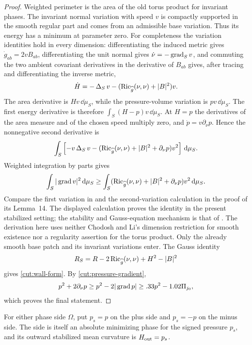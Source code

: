 \begin{proof}
Weighted perimeter is the area of the old torus product for invariant
phases.  The invariant normal variation with speed $v$ is compactly
supported in the smooth regular part and comes from an admissible base
variation.  Thus its energy has a minimum at parameter zero.
For completeness the variation identities hold in every dimension:
differentiating the induced metric gives $\dot g_{ab}=2vB_{ab}$,
differentiating the unit normal gives $\dot\nu=-\operatorname{grad}_Sv$, and
commuting the two ambient covariant derivatives in the derivative of
$B_{ab}$ gives, after tracing and differentiating the inverse metric,
\[
 \dot H=-\operatorname{\Delta}_S v-(\operatorname{Ric}_{\widehat g}(\nu,\nu)+|B|^2)v.
\]
The area derivative is $Hv\,\dd\mu_S$, while the pressure-volume
variation is $pv\,\dd\mu_S$.  The first energy derivative is therefore
$\int_S(H-p)v\,\dd\mu_S$.  At $H=p$ the derivatives of the area
measure and of the chosen speed multiply zero, and
$\dot p=v\partial_\nu p$.  Hence the nonnegative second derivative is
\[
 \int_S\left[-v\operatorname{\Delta}_Sv-
 (\operatorname{Ric}_{\widehat g}(\nu,\nu)+|B|^2+\partial_\nu p)v^2\right]
                         \,\mathrm d\mu_S.
\]
Weighted integration by parts gives
\[
 \int_S|\operatorname{grad} v|^2\,\mathrm d\mu_S
 \ge\int_S(\operatorname{Ric}_{\widehat g}(\nu,\nu)+|B|^2+
                           \partial_\nu p)v^2\,\mathrm d\mu_S.
\]
Compare the first variation in \citet[Lemma~13]{chodoshLi} and the
second-variation calculation in the proof of its Lemma~14. The displayed
calculation proves the identity in the present stabilized setting; the
stability and Gauss-equation mechanism is that of
\citet[Section~1]{schoenYau1979Structure}.
The derivation here uses neither Chodosh and Li's dimension restriction
for smooth existence nor a regularity assertion for the torus product.
Only the already smooth base patch and its invariant variations enter.
The Gauss identity
\[
 R_S=R-2\operatorname{Ric}_{\widehat g}(\nu,\nu)+H^2-|B|^2
\]
gives \eqref{cut:wall-form}.  By \eqref{cut:pressure-gradient},
\[
 p^2+2\partial_\nu p
       \ge p^2-2|\operatorname{grad} p|
       \ge .33p^2-1.02\Pi_{j_0},
\]
which proves the final statement.
\end{proof}

For either phase side $\Omega$, put $p_s=p$ on the plus side and
$p_s=-p$ on the minus side.  The side is itself an absolute minimizing
phase for the signed pressure $p_s$, and its outward stabilized mean
curvature is $H_{\rm out}=p_s$.


